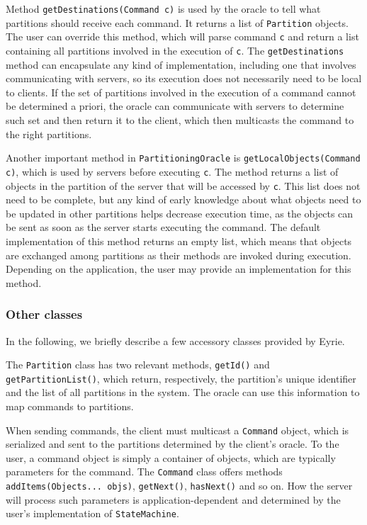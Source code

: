 \documentclass[10pt, conference, compsocconf, letterpaper]{IEEEtranv17}
\begin{document}
Method \verb#getDestinations(Command c)# is used by the oracle to tell what partitions should receive each command. It returns a list of \verb#Partition# objects. 
The user can override this method, which will parse command \verb#c# and return a list containing all partitions involved in the execution of \verb#c#. The \verb#getDestinations# method can encapsulate any kind of implementation, including one that involves communicating with servers, so its execution does not necessarily need to be local to clients. If the set of partitions involved in the execution of a command cannot be determined a priori, the oracle can communicate with servers to determine such set and then return it to the client, which then multicasts the command to the right partitions.

Another important method in \texttt{PartitioningOracle} is \verb#getLocalObjects(Command c)#\!, which is used by servers before executing \verb#c#.
The method returns a list of objects in the partition of the server that will be accessed by \verb#c#. 
This list does not need to be complete, but any kind of early knowledge about what objects need to be updated in other partitions helps decrease execution time, as the objects can be sent as soon as the server starts executing the command. The default implementation of this method returns an empty list, which means that objects are exchanged among partitions as their methods are invoked during execution. Depending on the application, the user may provide an implementation for this method.


\subsubsection{Other classes}
In the following, we briefly describe a few accessory classes provided by Eyrie.

The \verb#Partition# class %
has two relevant methods, \verb#getId()# and \verb#getPartitionList()#, which return, respectively, the partition's unique identifier and the list of all partitions in the system.
The oracle can use this information to map commands to partitions.

When sending commands, the client must multicast a \verb#Command# object, which is serialized and sent to the partitions determined by the client's oracle. To the user, a command object is simply a container of objects, which are typically parameters for the command. The \verb#Command# class offers methods \verb#addItems(Objects... objs)#, \verb#getNext()#, \verb#hasNext()# and so on. How the server will process such parameters is application-dependent and determined by %
the user's implementation of \verb#StateMachine#.
\end{document}
